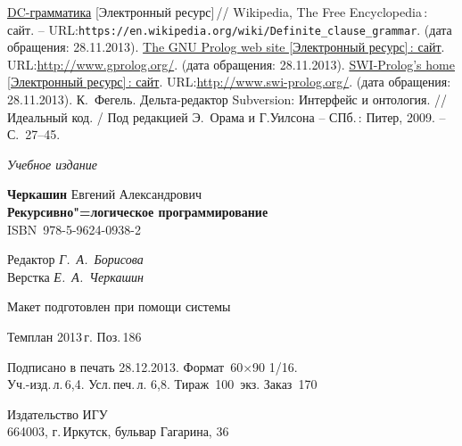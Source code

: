 \documentclass[14pt, openany, twoside, draft]{extbook} %
\def\emphbib#1{#1}
\begin{document}
\begin{thebibliography}{99}
 \emphbib{\href{https://en.wikipedia.org/wiki/Definite_clause_grammar}{DC-грамматика}} [Электронный ресурс]\,{}// Wikipedia, The Free Encyclopedia\,{}: сайт. -- URL:\texttt{https://en.wikipedia.org/wiki/Definite\_clause\linebreak\_grammar}. (дата обращения: 28.11.2013).
 \emphbib{\href{http://www.gprolog.org/}{The GNU Prolog web site [Электронный ресурс]\,{}: сайт}}. URL:\url{http://www.gprolog.org/}. (дата обращения: 28.11.2013).
 \emphbib{\href{http://www.swi-prolog.org/}{SWI-Prolog's
      home [Электронный ресурс]\,{}:
      сайт}}. URL:\url{http://www.swi-prolog.org/}. (дата обращения:
  28.11.2013).
 К.~Фегель. Дельта-редактор Subversion: Интерфейс и
  онтология. // Идеальный код. / Под редакцией Э.~Орама и Г.Уилсона --
  СПб.\,: Питер, 2009. -- С.~27--45.
\end{thebibliography}
\label{lastpage}
\newpage
\thispagestyle{empty}
\mbox{}

\vfill\vfill\vfill\vfill

\hfill{}{\small\itshape Учебное издание}
\vspace{4ex}
\begin{center}
{\small\textbf{Черкашин} Евгений Александрович\\[1em]}
{\bfseries Рекурсивно"=логическое программирование}\\[1em]
ISBN~978-5-9624-0938-2
\vfill

\small
Редактор \textit{Г.~А.~Борисова}\\
Верстка \textit{Е.~А.~Черкашин}

\vfill{}
{\small Макет подготовлен при помощи системы \LuaLaTeX\\\mbox{}}
\vfill{}

Темплан 2013\,{}г. Поз.\,{}186

\end{center}
\begin{center}\small
\noindent Подписано в печать 28.12.2013.
Формат~60$\times$90 1/16.\\  %
Уч.-изд.\,{}л.\,{}6,4. Усл.\,{}печ.\,{}л. 6,8. Тираж~100~экз. Заказ~170
\end{center}
\vspace{1           ex}
\begin{center}\small
Издательство ИГУ\\{}
664003, г.\,{}Иркутск, бульвар Гагарина, 36
\end{center}
\end{document}
